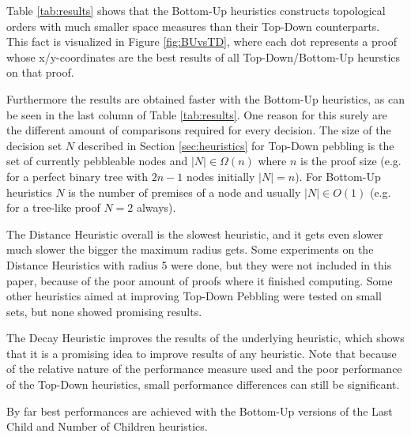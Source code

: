 \documentclass{llncs}
\begin{document}
\noindent
Table \ref{tab:results} shows that the Bottom-Up heuristics constructs topological orders with much smaller space measures than their Top-Down counterparts. This fact is visualized in Figure \ref{fig:BUvsTD}, where each dot represents a proof whose x/y-coordinates are the best results of all Top-Down/Bottom-Up heurstics on that proof.

Furthermore the results are obtained faster with the Bottom-Up heuristics, as can be seen in the last column of Table \ref{tab:results}.
One reason for this surely are the different amount of comparisons required for every decision. The size of the decision set $N$ described in Section \ref{sec:heuristics} for Top-Down pebbling is the set of currently pebbleable nodes and $|N| \in \Omega(n)$ where $n$ is the proof size (e.g. for a perfect binary tree with $2n -1$ nodes initially $|N| = n$). For Bottom-Up heuristics $N$ is the number of premises of a node and usually $|N| \in O(1)$ (e.g. for a tree-like proof $N = 2$ always). 

The Distance Heuristic overall is the slowest heuristic, and it gets even slower much slower the bigger the maximum radius gets. Some experiments on the Distance Heuristics with radius 5 were done, but they were not included in this paper, because of the poor amount of proofs where it finished computing. Some other heuristics aimed at improving Top-Down Pebbling were tested on small sets, but none showed promising results.

The Decay Heuristic improves the results of the underlying heuristic, which shows that it is a promising idea to improve results of any heuristic. Note that because of the relative nature of the performance measure used and the poor performance of the Top-Down heuristics, small performance differences can still be significant.

By far best performances are achieved with the Bottom-Up versions of the Last Child and Number of Children heuristics.
\end{document}
